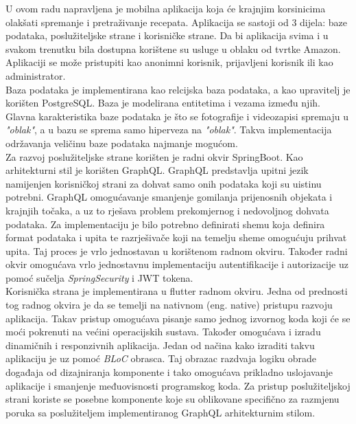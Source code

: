 \documentclass[times, utf8, zavrsni]{fer}
\begin{document}
\begin{sazetak}
      U ovom radu napravljena je mobilna aplikacija koja će krajnjim korsinicima olakšati spremanje i pretraživanje
      recepata. Aplikacija se sastoji od 3 dijela: baze podataka, poslužiteljske strane i korisničke strane.
      Da bi aplikacija svima i u svakom trenutku bila dostupna korištene su usluge u oblaku od tvrtke Amazon.
      Aplikaciji se može pristupiti kao anonimni korisnik, prijavljeni korisnik ili kao administrator.
      \\
      Baza podataka je implementirana kao relcijska baza podataka, a kao upravitelj je korišten PostgreSQL.
      Baza je modelirana entitetima i vezama između njih. Glavna karakteristika baze podataka je što se fotografije
      i videozapisi spremaju u \textit{"oblak"}, a u bazu se sprema samo hiperveza na \textit{"oblak"}. Takva implementacija
      održavanja veličinu baze podataka najmanje mogućom.
      \\
      Za razvoj poslužiteljske strane korišten je radni okvir SpringBoot. Kao arhitekturni stil je korišten GraphQL.
      GraphQL predstavlja upitni jezik namijenjen korisničkoj strani za dohvat samo onih podataka
      koji su uistinu potrebni. GraphQL omogućavanje smanjenje gomilanja prijenosnih objekata i krajnjih točaka,
      a uz to rješava problem prekomjernog i nedovoljnog dohvata podataka. Za implementaciju je bilo potrebno definirati
      shemu koja definira format podataka i upita te razrješivače koji na temelju sheme omogućuju prihvat upita.
      Taj proces je vrlo jednostavan u korištenom radnom okviru. Također radni okvir omogućava vrlo jednostavnu
      implementaciju autentifikacije i autorizacije uz pomoć sučelja \textit{SpringSecurity} i JWT tokena.
      \\
      Korisnička strana je implementirana u flutter radnom okviru. Jedna od prednosti tog radnog okvira je da se
      temelji na nativnom (eng. native) pristupu razvoju aplikacija. Takav pristup omogućava pisanje samo jednog izvornog koda koji će se moći pokrenuti
      na većini operacijskih sustava. Također omogućava i izradu dinamičnih i responzivnih aplikacija. Jedan od načina kako
      izraditi takvu aplikaciju je uz pomoć \textit{BLoC} obrasca. Taj obrazac razdvaja logiku obrade događaja od dizajniranja
      komponente i tako omogućava prikladno uslojavanje aplikacije i smanjenje međuovisnosti programskog koda. Za pristup
      poslužiteljskoj strani koriste se posebne komponente koje su oblikovane specifično za razmjenu poruka sa poslužiteljem
      implementiranog GraphQL arhitekturnim stilom.
      \newpage
\end{sazetak}
\end{document}
